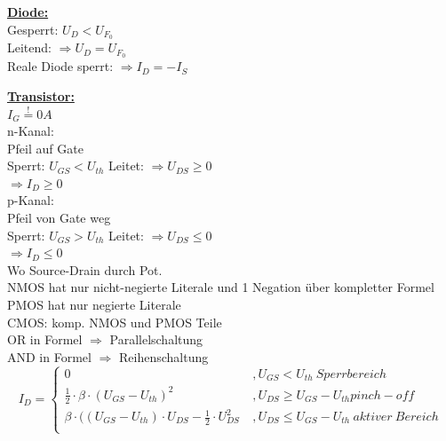 \documentclass[11pt]{article}
\begin{document}
\begin{minipage}{0.33\textwidth}

\underline{\textbf{Diode:}}\\
Gesperrt: $U_D < U_{F_0}$\\
Leitend: $\Rightarrow U_D = U_{F_0}$\\
Reale Diode sperrt: $\Rightarrow I_D = -I_S$

\underline{\textbf{Transistor:}}\\
$I_G \stackrel{!}{=} 0A$\\
n-Kanal:\\
\phantom{ss} Pfeil auf Gate\\
\phantom{ss} Sperrt: $U_{GS} < U_{th}$
\phantom{ss} Leitet: $\Rightarrow U_{DS} \geq 0$\\
\phantom{sssssisisssi}$\Rightarrow I_D \geq 0$\\



p-Kanal:\\
\phantom{ss} Pfeil von Gate weg\\
\phantom{ss} Sperrt: $U_{GS} > U_{th}$
\phantom{ss} Leitet: $\Rightarrow U_{DS} \leq 0$\\
\phantom{sssssisisssi}$\Rightarrow I_D \leq 0$\\

Wo Source-Drain durch Pot.\\
NMOS hat nur nicht-negierte Literale und 1 Negation über kompletter Formel\\
PMOS hat nur negierte Literale\\
CMOS: komp. NMOS und PMOS Teile\\
OR in Formel $\Rightarrow$ Parallelschaltung\\
AND in Formel $\Rightarrow$ Reihenschaltung\\

\[I_D = \left\{
  \begin{array}{lr}
    0 & , U_{GS} < U_{th}~Sperrbereich\\
    \frac{1}{2} \cdot \beta \cdot(U_{GS} - U_{th})^2  \ & , U_{DS} \ge U_{GS} - U_{th} pinch-off\\
       \beta \cdot((U_{GS} - U_{th}) \cdot U_{DS} - \frac{1}{2} \cdot U_{DS}^2  \ & , U_{DS} \leq U_{GS} - U_{th}~aktiver~Bereich\\
  \end{array}
\right.
\]
\end{minipage}
~~~~~~~
\end{document}
